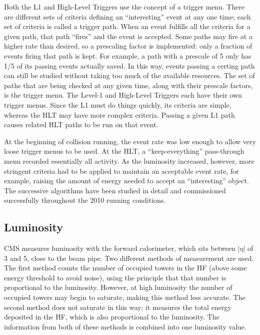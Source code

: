 Both the L1 and High-Level Triggers use the concept of a trigger menu.  
There are different sets of criteria defining an ``interesting'' event 
at any one time;  
each set of criteria is called a trigger path.  
When an event fulfills all the criteria for a given path, 
that path ``fires'' and the event is accepted.  
Some paths may fire at a higher rate than desired, 
so a prescaling factor is implemented: 
only a fraction of events firing that path is kept.  
For example, a path with a prescale of 5 only 
has 1/5 of its passing events actually saved.  
In this way, events passing a certing path can still 
be studied without taking too much of the available resources.  
The set of paths that are being checked at any given time,
along with their prescale factors,  
is the trigger menu.  
The Level-1 and High-Level Triggers each have their own 
trigger menus.  
Since the L1 must do things quickly, 
its criteria are simple, 
whereas the HLT may have more complex criteria.  
Passing a given L1 path causes 
related HLT paths to be run on that event.  

At the beginning of collision running, 
the event rate was low enough to allow very loose trigger 
menus to be used.  
At the HLT, a ``keep-everything'' pass-through menu 
recorded essentially all activity.  
As the luminosity increased, however, more stringent criteria had 
to be applied to maintain an acceptable event rate, 
for example, raising the amount of energy needed to accept an 
``interesting'' object.  
The successive algorithms have been studied in detail and 
commissioned successfully throughout the 2010 running conditions.  

\subsection{Luminosity}

CMS measures luminosity with the forward calorimeter, which sits 
between $|\eta|$ of 3 and 5, close to the beam pipe.  
Two different methods of measurement are used.  
The first method counts the number of occupied towers in the HF 
(above some energy threshold to avoid noise), 
using the principle that that number is proportional to the luminosity.  
However, at high luminosity the number of occupied towers may begin to 
saturate, making this method less accurate.  
The second method does not saturate in this way: 
it measures the total energy deposited in the HF, 
which is also proportional to the luminosity.  
The information from both of these methods is combined into one 
luminosity value.  

